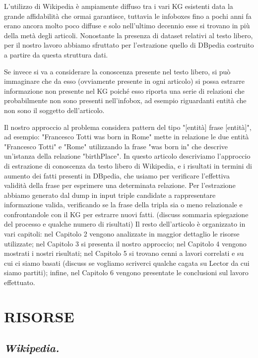 \documentclass[10pt,a4paper,twocolumn]{article}
\begin{document}
L'utilizzo di Wikipedia è ampiamente diffuso tra i vari KG esistenti data la grande affidabilità che ormai garantisce, tuttavia le infoboxes fino a pochi anni fa erano ancora molto poco diffuse e solo nell'ultimo decennio esse si trovano in più della metà degli articoli. Nonostante la presenza di dataset relativi al testo libero, per il nostro lavoro abbiamo sfruttato per l'estrazione quello di DBpedia costruito a partire da questa struttura dati.

Se invece si va a considerare la conoscenza presente nel testo libero, si può immaginare che da esso (ovviamente presente in ogni articolo) si possa estrarre informazione non presente nel KG poiché esso riporta una serie di relazioni che probabilmente non sono presenti nell'infobox, ad esempio riguardanti entità che non sono il soggetto dell'articolo.

Il nostro approccio al problema considera pattern del tipo 
"[entità] frase [entità]", ad esempio: "Francesco Totti was born in Rome" mette in relazione le due entità "Francesco Totti" e "Rome" utilizzando la frase "was born in" che descrive un'istanza della relazione "birthPlace".
In questo articolo descriviamo l'approccio di estrazione di conoscenza da testo libero di Wikipedia, e i risultati in termini di aumento dei fatti presenti in DBpedia, che usiamo per verificare l'effettiva validità della frase per esprimere una determinata relazione.
Per l'estrazione abbiamo generato dal dump in input triple candidate a rappresentare informazione valida, verificando se la frase della tripla sia o meno relazionale e confrontandole con il KG per estrarre nuovi fatti.
(discuss sommaria spiegazione del processo e qualche numero di risultati)
Il resto dell'articolo è organizzato in vari capitoli: nel Capitolo 2 vengono analizzate in maggior dettaglio le risorse utilizzate; nel Capitolo 3 si presenta il nostro approccio; nel Capitolo 4 vengono mostrati i nostri risultati; nel Capitolo 5 si trovano cenni a lavori correlati e su cui ci siamo basati (discuss se vogliamo scriverci qualche cagata su Lector da cui siamo partiti); infine, nel Capitolo 6 vengono presentate le conclusioni sul lavoro effettuato.

\section{RISORSE}
\subsection*{\textit{Wikipedia.}}
\end{document}
